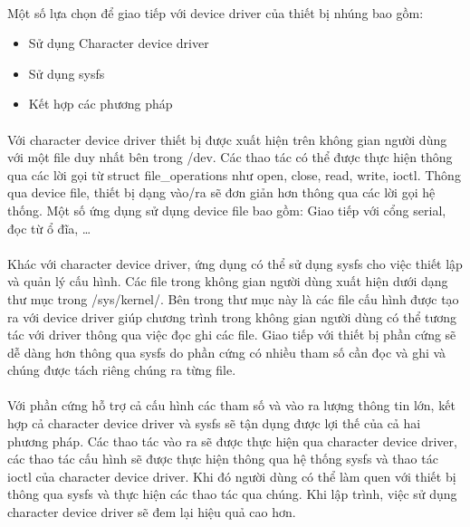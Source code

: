 \paragraph{}
Một số lựa chọn để giao tiếp với device driver của thiết bị nhúng bao gồm:

\begin{itemize}
	\item Sử dụng Character device driver
	\item Sử dụng sysfs
	\item Kết hợp các phương pháp
\end{itemize}
	
\paragraph{}
Với character device driver thiết bị được xuất hiện trên không gian người dùng với một file duy nhất bên trong /dev. Các thao tác có thể được thực hiện thông qua các lời gọi từ struct file\_operations như open, close, read, write, ioctl. Thông qua device file, thiết bị dạng vào/ra sẽ đơn giản hơn thông qua các lời gọi hệ thống. Một số ứng dụng sử dụng device file bao gồm: Giao tiếp với cổng serial, đọc từ ổ đĩa, …
\paragraph{}
Khác với character device driver, ứng dụng có thể sử dụng sysfs cho việc thiết lập và quản lý cấu hình. Các file trong không gian người dùng xuất hiện dưới dạng thư mục trong /sys/kernel/. Bên trong thư mục này là các file cấu hình được tạo ra với device driver giúp chương trình trong không gian người dùng có thể tương tác với driver thông qua việc đọc ghi các file. Giao tiếp với thiết bị phần cứng sẽ dễ dàng hơn thông qua sysfs do phần cứng có nhiều tham số cần đọc và ghi và chúng được tách riêng chúng ra từng file.
\paragraph{}
Với phần cứng hỗ trợ cả cấu hình các tham số và vào ra lượng thông tin lớn, kết hợp cả character device driver và sysfs sẽ tận dụng được lợi thế của cả hai phương pháp. Các thao tác vào ra sẽ được thực hiện qua character device driver, các thao tác cấu hình sẽ được thực hiện thông qua hệ thống sysfs và thao tác ioctl của character device driver. Khi đó người dùng có thể làm quen với thiết bị thông qua sysfs và thực hiện các thao tác qua chúng. Khi lập trình, việc sử dụng character device driver sẽ đem lại hiệu quả cao hơn.
